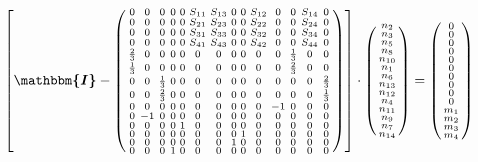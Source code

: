 \documentclass[10pt]{article} \usepackage{amsmath} \usepackage{bbold}
\begin{document}
\[ \left[ \boldsymbol{\mathbbm{I}}  - \left(\begin{smallmatrix} 0 & 0
& 0 & 0 & 0 & S_{11} & S_{13} & 0 & 0 & S_{12} & 0 & 0 & S_{14} & 0 \\
0 & 0 & 0 & 0 & 0 & S_{21} & S_{23} & 0 & 0 & S_{22} & 0 & 0 & S_{24}
& 0 \\ 0 & 0 & 0 & 0 & 0 & S_{31} & S_{33} & 0 & 0 & S_{32} & 0 & 0 &
S_{34} & 0 \\ 0 & 0 & 0 & 0 & 0 & S_{41} & S_{43} & 0 & 0 & S_{42} & 0
& 0 & S_{44} & 0 \\ \frac{2}{3} & 0 & 0 & 0 & 0 & 0 & 0 & 0 & 0 & 0 &
0 & \frac{1}{3} & 0 & 0 \\ \frac{1}{3} & 0 & 0 & 0 & 0 & 0 & 0 & 0 & 0
& 0 & 0 & \frac{2}{3} & 0 & 0 \\ 0 & 0 & \frac{1}{3} & 0 & 0 & 0 & 0 &
0 & 0 & 0 & 0 & 0 & 0 & \frac{2}{3} \\ 0 & 0 & \frac{2}{3} & 0 & 0 & 0
& 0 & 0 & 0 & 0 & 0 & 0 & 0 & \frac{1}{3} \\ 0 & 0 & 0 & 0 & 0 & 0 & 0
& 0 & 0 & 0 & -1 & 0 & 0 & 0 \\ 0 & -1 & 0 & 0 & 0 & 0 & 0 & 0 & 0 & 0
& 0 & 0 & 0 & 0 \\ 0 & 0 & 0 & 0 & 1 & 0 & 0 & 0 & 0 & 0 & 0 & 0 & 0 &
0 \\ 0 & 0 & 0 & 0 & 0 & 0 & 0 & 0 & 1 & 0 & 0 & 0 & 0 & 0 \\ 0 & 0 &
0 & 0 & 0 & 0 & 0 & 1 & 0 & 0 & 0 & 0 & 0 & 0 \\ 0 & 0 & 0 & 1 & 0 & 0
& 0 & 0 & 0 & 0 & 0 & 0 & 0 & 0 \end{smallmatrix}\right)\right] \cdot
\left(\begin{smallmatrix} n_{2} \\ n_{3} \\ n_{5} \\ n_{8} \\ n_{10}
\\ n_{1} \\ n_{6} \\ n_{13} \\ n_{12} \\ n_{4} \\ n_{11} \\ n_{9} \\
n_{7} \\ n_{14} \end{smallmatrix}\right) = \left(\begin{smallmatrix} 0
\\ 0 \\ 0 \\ 0 \\ 0 \\ 0 \\ 0 \\ 0 \\ 0 \\ 0 \\ m_{1} \\ m_{2} \\
m_{3} \\ m_{4} \end{smallmatrix}\right) \]
\end{document}
